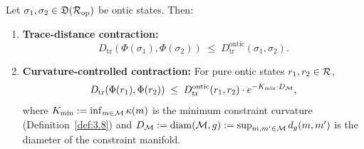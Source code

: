\begin{theorem}
\label{thm:8.4}
Let $\sigma_1, \sigma_2 \in \mathfrak{D}(\mathcal{R}_{\mathrm{op}})$ be ontic
states.  Then:
\begin{enumerate}
  \item[\textup{(i)}] \textbf{Trace-distance contraction:}
    \[
      D_{\mathrm{tr}}(\Phi(\sigma_1), \Phi(\sigma_2))
      \;\leq\;
      D_{\mathrm{tr}}^{\mathrm{ontic}}(\sigma_1, \sigma_2).
    \]
  \item[\textup{(ii)}] \textbf{Curvature-controlled contraction:}
    For pure ontic states $r_1, r_2 \in \mathcal{R}$,
    \[
      D_{\mathrm{tr}}(\Phi(r_1), \Phi(r_2))
      \;\leq\;
      D_{\mathrm{tr}}^{\mathrm{ontic}}(r_1, r_2)
      \cdot e^{-K_{\min} \cdot D_{\mathcal{M}}},
    \]
    where
    $K_{\min} := \inf_{m \in \mathcal{M}} \kappa(m)$ is the minimum constraint
    curvature \textup{(}Definition~\textup{\ref{def:3.8})} and
    $D_{\mathcal{M}} := \mathrm{diam}(\mathcal{M}, g) := \sup_{m,m' \in \mathcal{M}}
    d_g(m, m')$ is the diameter of the constraint manifold.
\end{enumerate}
\end{theorem}

